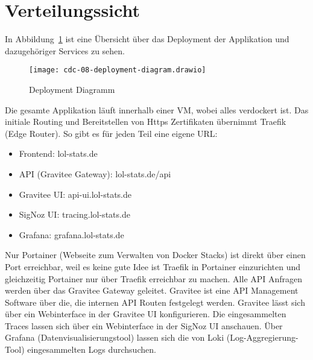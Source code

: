\section{Verteilungssicht}

In Abbildung~\ref{fig:deployment-diagram} ist eine Übersicht über das Deployment der Applikation und dazugehöriger
Services zu sehen.
\begin{figure}[H]
    \centering
    \texttt{[image: cdc-08-deployment-diagram.drawio]}
    \caption{Deployment Diagramm}
    \label{fig:deployment-diagram}
\end{figure}

Die gesamte Applikation läuft innerhalb einer VM, wobei alles verdockert ist.
Das initiale Routing und Bereitstellen von Https Zertifikaten übernimmt Traefik (Edge Router).
So gibt es für jeden Teil eine eigene URL:
\begin{itemize}
    \item Frontend: lol-stats.de
    \item API (Gravitee Gateway): lol-stats.de/api
    \item Gravitee UI: api-ui.lol-stats.de
    \item SigNoz UI: tracing.lol-stats.de
    \item Grafana: grafana.lol-stats.de
\end{itemize}

Nur Portainer (Webseite zum Verwalten von Docker Stacks) ist direkt über einen Port erreichbar, weil es keine gute Idee ist Traefik in Portainer einzurichten
und gleichzeitig Portainer nur über Traefik erreichbar zu machen.
Alle API Anfragen werden über das Gravitee Gateway geleitet.
Gravitee ist eine API Management Software über die, die internen API Routen festgelegt werden.
Gravitee lässt sich über ein Webinterface in der Gravitee UI konfigurieren.
Die eingesammelten Traces lassen sich über ein Webinterface in der SigNoz UI anschauen.
Über Grafana (Datenvisualisierungstool) lassen sich die von Loki (Log-Aggregierung-Tool) eingesammelten Logs durchsuchen.
